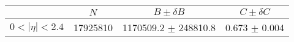 \begin{tabular}{lccc}
\hline
    &   $N$   & $B \pm \delta B$  &  $C \pm \delta C$ \\
\hline
$0 < |\eta| <2.4$              & 17925810   & 1170509.2  $\pm$ 248810.8 & 0.673      $\pm$ 0.004 \\
\hline
\end{tabular}
